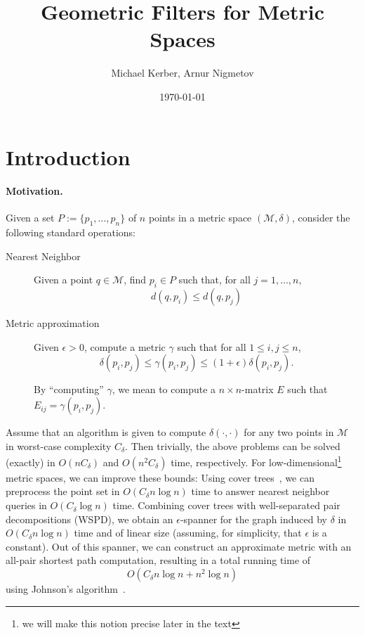 \documentclass[10pt]{article}
\title{Geometric Filters for Metric Spaces}
\author{Michael Kerber, Arnur Nigmetov}
\date{\today}
\newcommand{\eps}{\epsilon}
\newcommand{\pointset}{P}
\newcommand{\distspace}{\mathcal{M}}
\newcommand{\dist}{\delta}
\newcommand{\adist}{\gamma}
\newcommand{\complexity}{C_{\dist}}
\begin{document}
\maketitle

\section{Introduction}

\paragraph{Motivation.}
%
Given a set $\pointset:=\{p_1,\ldots,p_n\}$ of $n$ points
in a metric space $(\distspace,\dist)$, 
consider the following standard operations:

\begin{description}
\item[Nearest Neighbor] Given a point $q\in\distspace$,
find $p_i\in\pointset$ such that, for all $j=1,\ldots,n$,
\[d(q,p_i)\leq d(q,p_j)\]

\item[Metric approximation] Given $\eps>0$, compute a metric $\adist$
such that for all $1\leq i,j\leq n$,
%
\[\dist(p_i,p_j)\leq \adist(p_i,p_j) \leq (1+\eps) \dist(p_i,p_j).\]

By ``computing'' $\adist$, we mean to compute a $n\times n$-matrix $E$ 
such that $E_{ij}=\adist(p_i,p_j)$.
\end{description}

Assume that an algorithm is given to compute $\dist(\cdot,\cdot)$
for any two points in $\distspace$ in worst-case complexity $\complexity$.
Then trivially, the above problems can be solved (exactly) in
$O(n\complexity)$ and $O(n^2\complexity)$ time, respectively.
For low-dimensional\footnote{we will make this notion precise
later in the text} metric spaces, we can improve these bounds:
Using cover trees~\cite{cover-trees}, we can preprocess the point set
in $O(\complexity n\log n)$ time to answer nearest neighbor queries
in $O(\complexity \log n)$ time. Combining cover trees with well-separated
pair decompositions (WSPD), we obtain an $\eps$-spanner for the graph
induced by $\dist$ in $O(\complexity n\log n)$ time and
of linear size (assuming, for simplicity, that $\eps$ is a constant).
Out of this spanner,
we can construct an approximate metric
with an all-pair shortest path computation,
resulting in a total running time of
\[O(\complexity n\log n+ n^2\log n)\]
using Johnson's algorithm~\cite{johnson}.
\end{document}
